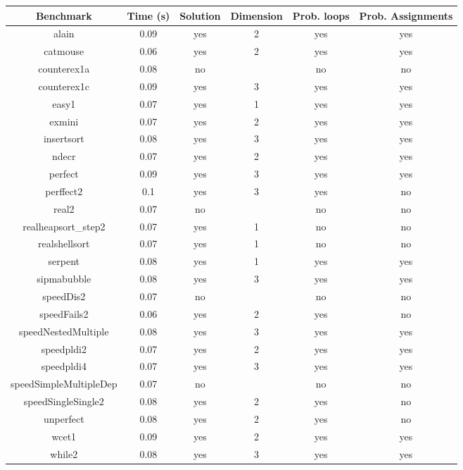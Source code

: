 
\begin{center}
\begin{table}[]
  \centering
   \begin{tabular}{c|c|c|c|c|c}
    
   {Benchmark} & {Time (s)} & {Solution} & {Dimension} & {Prob. loops} & {Prob. Assignments
} \\\hline
{alain} & {0.09} & {yes} & {2} & {yes} & {yes
} \\\hline
{catmouse} & {0.06} & {yes} & {2} & {yes} & {yes
} \\\hline
{counterex1a} & {0.08} & {no} & {} & {no} & {no
} \\\hline
{counterex1c} & {0.09} & {yes} & {3} & {yes} & {yes
} \\\hline
{easy1} & {0.07} & {yes} & {1} & {yes} & {yes
} \\\hline
{exmini} & {0.07} & {yes} & {2} & {yes} & {yes
} \\\hline
{insertsort} & {0.08} & {yes} & {3} & {yes} & {yes
} \\\hline
{ndecr} & {0.07} & {yes} & {2} & {yes} & {yes
} \\\hline
{perfect} & {0.09} & {yes} & {3} & {yes} & {yes
} \\\hline
{perffect2} & {0.1} & {yes} & {3} & {yes} & {no
} \\\hline
{real2} & {0.07} & {no} & {} & {no} & {no
} \\\hline
{realheapsort\_step2} & {0.07} & {yes} & {1} & {no} & {no
} \\\hline
{realshellsort} & {0.07} & {yes} & {1} & {no} & {no
} \\\hline
{serpent} & {0.08} & {yes} & {1} & {yes} & {yes
} \\\hline
{sipmabubble} & {0.08} & {yes} & {3} & {yes} & {yes
} \\\hline
{speedDis2} & {0.07} & {no} & {} & {no} & {no
} \\\hline
{speedFails2} & {0.06} & {yes} & {2} & {yes} & {no
} \\\hline
{speedNestedMultiple} & {0.08} & {yes} & {3} & {yes} & {yes
} \\\hline
{speedpldi2} & {0.07} & {yes} & {2} & {yes} & {yes
} \\\hline
{speedpldi4} & {0.07} & {yes} & {3} & {yes} & {yes
} \\\hline
{speedSimpleMultipleDep} & {0.07} & {no} & {} & {no} & {no
} \\\hline
{speedSingleSingle2} & {0.08} & {yes} & {2} & {yes} & {no
} \\\hline
{unperfect} & {0.08} & {yes} & {2} & {yes} & {no
} \\\hline
{wcet1} & {0.09} & {yes} & {2} & {yes} & {yes
} \\\hline
{while2} & {0.08} & {yes} & {3} & {yes} & {yes} \\\hline
    

\end{tabular}
\end{table}
\end{center}

